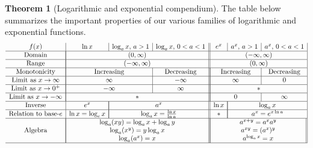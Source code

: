 \documentclass[11pt]{article}
\theoremstyle{definition}
\theoremstyle{named}
\newtheorem*{namedtheorem}{Theorem}
\numberwithin{myalgctr}{section}
\begin{document}
\begin{namedtheorem}[Logarithmic and exponential compendium] The table below summarizes the important properties of our various families of logarithmic and exponential functions.
\[
\begin{array}{c|c|c|c||c|c|c|}
  f(x) & \ln x& \log_a x,\, a>1& \log_a x,\, 0<a<1&  e^x & a^x,\, a>1 & a^x,\, 0<a<1 \\
  \hline
  \text{Domain} &\multicolumn{3}{|c||}{(0,\infty)}&\multicolumn{3}{c|}{(-\infty, \infty)}\\
  \hline
  \text{Range} &\multicolumn{3}{|c||}{(-\infty,\infty)}&\multicolumn{3}{c|}{(0, \infty)}\\
  \hline
  \text{Monotonicity}&\multicolumn{2}{|c|}{\text{Increasing}}&\text{Decreasing}&\multicolumn{2}{|c|}{\text{Increasing}}&\text{Decreasing}\\
  \hline
  \text{Limit as }x\to\infty& \multicolumn{2}{|c|}{\infty}&-\infty &  \multicolumn{2}{|c|}{\infty}& 0\\
  \hline
  \text{Limit as }x\to 0^+ & \multicolumn{2}{|c|}{-\infty}& \infty & \multicolumn{3}{|c|}{*}\\
  \hline
  \text{Limit as }x\to-\infty & \multicolumn{3}{|c||}{*}&  \multicolumn{2}{|c|}{0}& \infty\\
  \hline
  \text{Inverse}&e^x&\multicolumn{2}{|c||}{a^x}& \ln x& \multicolumn{2}{|c|}{\log_a x}\\
  \hline
  \text{Relation to base-$e$}&\ln x=\log_e x&\multicolumn{2}{|c||}{\log_a x=\frac{\ln x}{\ln a}} &* &\multicolumn{2}{|c|}{a^x=e^{x\ln a}}\\
  \hline
  \text{Algebra}&\multicolumn{3}{|c||}{\begin{array}{c}
    \log_a(xy)=\log_ax+\log_ay\\
    \log_a(x^y)=y\log_a x\\
    \log_a(a^x)=x
  \end{array}
  }
  &
  \multicolumn{3}{|c||}{\begin{array}{c}
    a^{x+y}=a^xa^y\\
    a^{xy}=(a^x)^y\\
    a^{\log_a x}=x
  \end{array}
  }\\
  \hline
\end{array}
\]


\end{namedtheorem}
\end{document}
